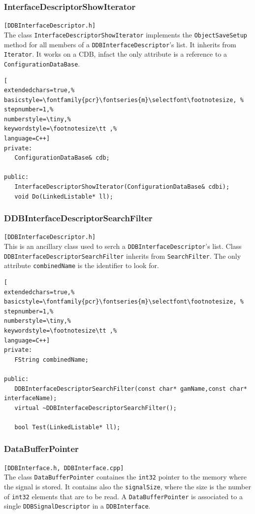 \subsubsection{InterfaceDescriptorShowIterator}
\texttt{[DDBInterfaceDescriptor.h]}\\
The class \texttt{InterfaceDescriptorShowIterator} implements the \texttt{ObjectSaveSetup} method for all members of a \texttt{DDBInterfaceDescriptor}'s list. It inherits from \texttt{Iterator}. It works on a CDB, infact the only attribute is a reference to a \texttt{ConfigurationDataBase}.

\begin{lstlisting}[
extendedchars=true,%
basicstyle=\fontfamily{pcr}\fontseries{m}\selectfont\footnotesize, %
stepnumber=1,%
numberstyle=\tiny,%
keywordstyle=\footnotesize\tt ,%
language=C++]
private:
   ConfigurationDataBase& cdb;

public:
   InterfaceDescriptorShowIterator(ConfigurationDataBase& cdbi);
   void Do(LinkedListable* ll);
\end{lstlisting}



\subsubsection{DDBInterfaceDescriptorSearchFilter}
\texttt{[DDBInterfaceDescriptor.h]}\\
This is an ancillary class used to serch a \texttt{DDBInterfaceDescriptor}'s list. Class \texttt{DDBInterfaceDescriptorSearchFilter} inherits from \texttt{SearchFilter}.
The only attribute \texttt{combinedName} is the identifier to look for.

\begin{lstlisting}[
extendedchars=true,%
basicstyle=\fontfamily{pcr}\fontseries{m}\selectfont\footnotesize, %
stepnumber=1,%
numberstyle=\tiny,%
keywordstyle=\footnotesize\tt ,%
language=C++]
private:
   FString combinedName;

public:
   DDBInterfaceDescriptorSearchFilter(const char* gamName,const char* interfaceName);
   virtual ~DDBInterfaceDescriptorSearchFilter();

   bool Test(LinkedListable* ll);
\end{lstlisting}



\subsubsection{DataBufferPointer}
\texttt{[DDBInterface.h, DDBInterface.cpp]}\\
The class \texttt{DataBufferPointer} containes the \texttt{int32} pointer to the memory where the signal is stored. It contains also the \texttt{signalSize}, where the size is the number of \texttt{int32} elements that are to be read. A \texttt{DataBufferPointer} is associated to a single \texttt{DDBSignalDescriptor} in a \texttt{DDBInterface}.\\


